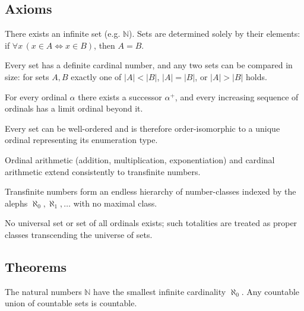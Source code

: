 \subsection*{Axioms}
\begin{axiom}
There exists an infinite set (e.g. $\mathbb{N}$). Sets are determined solely by their elements: if $\forall x\,(x\in A\Leftrightarrow x\in B)$, then $A=B$.
\end{axiom}

\begin{axiom}
Every set has a definite cardinal number, and any two sets can be compared in size: for sets $A,B$ exactly one of $|A|<|B|$, $|A|=|B|$, or $|A|>|B|$ holds.
\end{axiom}

\begin{axiom}
For every ordinal $\alpha$ there exists a successor $\alpha^+$, and every increasing sequence of ordinals has a limit ordinal beyond it.
\end{axiom}

\begin{axiom}
Every set can be well-ordered and is therefore order-isomorphic to a unique ordinal representing its enumeration type.
\end{axiom}

\begin{axiom}
Ordinal arithmetic (addition, multiplication, exponentiation) and cardinal arithmetic extend consistently to transfinite numbers.
\end{axiom}

\begin{axiom}
Transfinite numbers form an endless hierarchy of number-classes indexed by the alephs $\aleph_0,\aleph_1,\ldots$ with no maximal class.
\end{axiom}

\begin{axiom}
No universal set or set of all ordinals exists; such totalities are treated as proper classes transcending the universe of sets.
\end{axiom}

\subsection*{Theorems}
\begin{theorem}
The natural numbers $\mathbb{N}$ have the smallest infinite cardinality $\aleph_0$. Any countable union of countable sets is countable.
\end{theorem}

